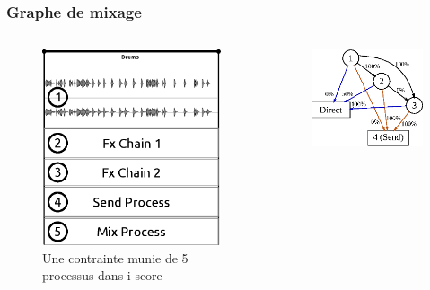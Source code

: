 \documentclass{beamer}
\begin{document}
\begin{frame}
	\frametitle{Graphe de mixage}    
	\Large
	\begin{columns}
		\begin{column}{0.5\textwidth}
			\begin{figure}
				\centering
				\includegraphics[width=\textwidth]{images/iscore1.eps}
				\caption{Une contrainte munie de 5 processus dans i-score}
			\end{figure}
		\end{column}
		\begin{column}{0.5\textwidth}
			\begin{figure}
				\centering
				\includegraphics[width=\textwidth]{images/graph1.eps}

\end{figure}
\end{column}
\end{columns}
\end{frame}
\end{document}
